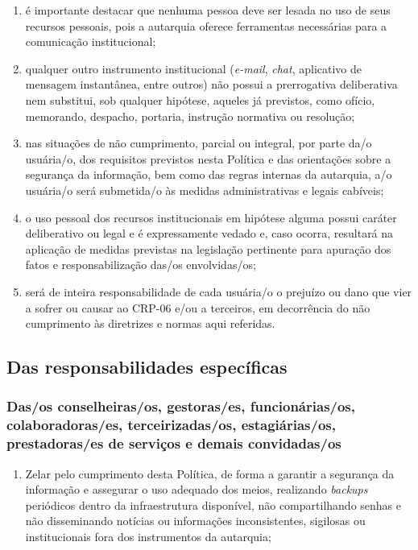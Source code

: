 \begin{enumerate}
    é vedado o uso de todo e qualquer meio não institucional de contas e
    dispositivos pessoais como \emph{e-mails} que não sejam
    institucionais, WhatsApp, Skype, redes sociais e outros fora do
    domínio da rede formal;
\item
    é importante destacar que nenhuma pessoa deve ser lesada no uso de
    seus recursos pessoais, pois a autarquia oferece ferramentas
    necessárias para a comunicação institucional;
\item
    qualquer outro instrumento institucional (\emph{e-mail}, \emph{chat},
    aplicativo de mensagem instantânea, entre outros) não possui a
    prerrogativa deliberativa nem substitui, sob qualquer hipótese,
    aqueles já previstos, como ofício, memorando, despacho, portaria,
    instrução normativa ou resolução;
\item
    nas situações de não cumprimento, parcial ou integral, por parte da/o
    usuária/o, dos requisitos previstos nesta Política e das orientações
    sobre a segurança da informação, bem como das regras internas da
    autarquia, a/o usuária/o será submetida/o às medidas administrativas e
    legais cabíveis;
\item
    o uso pessoal dos recursos institucionais em hipótese alguma possui
    caráter deliberativo ou legal e é expressamente vedado e, caso ocorra,
    resultará na aplicação de medidas previstas na legislação pertinente
    para apuração dos fatos e responsabilização das/os envolvidas/os;
\item
    será de inteira responsabilidade de cada usuária/o o prejuízo ou dano
    que vier a sofrer ou causar ao CRP-06 e/ou a terceiros, em decorrência
    do não cumprimento às diretrizes e normas aqui referidas.
\end{enumerate}

\subsection{Das responsabilidades
específicas}

\subsubsection{Das/os conselheiras/os, gestoras/es, funcionárias/os,
colaboradoras/es, terceirizadas/os, estagiárias/os, prestadoras/es de
serviços e demais
convidadas/os}

\begin{enumerate}

\item
    Zelar pelo cumprimento desta Política, de forma a garantir a segurança
    da informação e assegurar o uso adequado dos meios, realizando
    \emph{backups} periódicos dentro da infraestrutura disponível, não
    compartilhando senhas e não disseminando notícias ou informações
    inconsistentes, sigilosas ou institucionais fora dos instrumentos da
    autarquia;
\end{enumerate}

